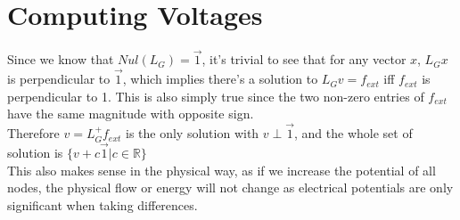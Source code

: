 \documentclass[12pt]{article}
\begin{document}
\section{Computing Voltages}
Since we know that $Nul(L_G) = \vec{1}$, it's trivial to see that for any vector $x$, $L_G x$ is perpendicular to $\vec{1}$, which implies there's a solution to $L_Gv = f_{ext}$ iff $f_{ext}$ is perpendicular to 1. This is also simply true since the two non-zero entries of $f_{ext}$ have the same magnitude with opposite sign.\\
\newline
Therefore $v = L_{G}^+ f_{ext}$ is the only solution with $v \perp \vec{1}$, and the whole set of solution is $\{v + c\vec{1} | c\in \mathbb{R}\}$ \\
\newline
This also makes sense in the physical way, as if we increase the potential of all nodes, the physical flow or energy will not change as electrical potentials are only significant when taking differences.
\end{document}
